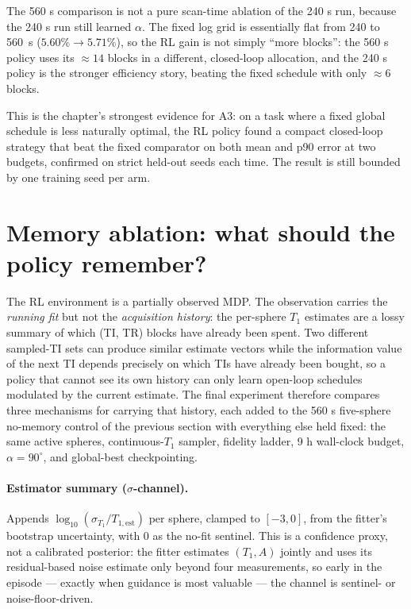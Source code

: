 The 560 s comparison is not a pure scan-time ablation of the 240 s run, because
the 240 s run still learned $\alpha$. The fixed log grid is essentially flat from
240 to 560~s ($5.60\% \to 5.71\%$), so the RL gain
is not simply ``more blocks'': the 560 s policy uses its ${\approx}14$ blocks in a
different, closed-loop allocation, and the 240 s policy is the stronger
efficiency story, beating the fixed schedule with only ${\approx}6$ blocks.

This is the chapter's strongest evidence for A3: on a task where a fixed global
schedule is less naturally optimal, the RL policy found a compact closed-loop
strategy that beat the fixed comparator on both mean and p90 error at two
budgets, confirmed on strict held-out seeds each time. The result is still
bounded by one training seed per arm.

\section{Memory ablation: what should the policy remember?}
\label{sec:e2-ablations}

The RL environment is a partially observed MDP. The observation carries the
\emph{running fit} but not the \emph{acquisition history}: the per-sphere
$T_1$ estimates are a lossy summary of which (TI, TR) blocks have already
been spent. Two different sampled-TI sets can produce similar estimate
vectors while the information value of the next TI depends precisely on
which TIs have already been bought, so a policy that cannot see its own
history can only learn open-loop schedules modulated by the current
estimate. The final experiment therefore compares three mechanisms for
carrying that history, each added to the 560 s five-sphere no-memory control
of the previous section with everything else held fixed: the same active
spheres, continuous-$T_1$ sampler, fidelity ladder, 9 h wall-clock budget,
$\alpha=90^\circ$, and global-best checkpointing.

\paragraph{Estimator summary ($\sigma$-channel).} Appends
$\log_{10}(\sigma_{T_1}/T_{1,\mathrm{est}})$ per sphere, clamped to
$[-3,0]$, from the fitter's bootstrap uncertainty, with $0$ as the no-fit
sentinel. This is a confidence proxy, not a calibrated posterior: the fitter
estimates $(T_1, A)$ jointly and uses its residual-based noise estimate only
beyond four measurements, so early in the episode --- exactly when guidance
is most valuable --- the channel is sentinel- or noise-floor-driven.

